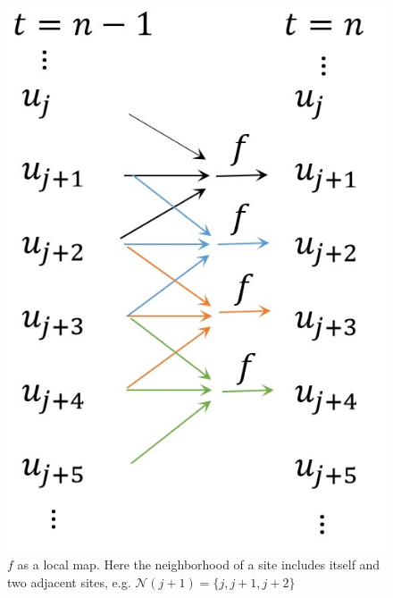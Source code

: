 \documentclass[11pt, reqno]{amsart}
\begin{document}
\begin{figure}
\centerline{\includegraphics[scale=0.4]{chapterGP/figures/diagram}}
\caption[$f$ as a Local Map] {\label{fig:local map}$f$ as a local map. Here the neighborhood of a site includes itself and two adjacent sites, e.g. $\mathcal{N}(j+1)=\{ j,j+1,j+2 \}$}
\end{figure}
\end{document}
